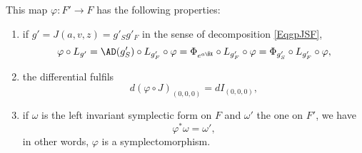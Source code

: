 \begin{proposition}
This map $\varphi\colon F'\to F$ has the following properties:
\begin{enumerate}
\item if $g'=J(a,v,z)=g'_{S}g'_{F}$ in the sense of decomposition \eqref{EqgpJSF},
\begin{equation}
\varphi\circ L_{g'}=\AD(g'_{S})\circ L_{g'_{F}}\circ\varphi=\Phi_{ e^{a\bar{\BX }}}\circ L_{g'_{F}}\circ\varphi=\Phi_{g'_{S}}\circ L_{g'_{F}}\circ\varphi,
\end{equation}
\item the differential fulfils
\begin{equation}
d(\varphi\circ J)_{(0,0,0)}=dI_{(0,0,0)},
\end{equation}
\item if $\omega$ is the left invariant symplectic form on $F$ and $\omega'$ the one on $F'$, we have
\[ 
  \varphi^*\omega=\omega',
\]
in other words, $\varphi$ is a symplectomorphism.

\end{enumerate}

\end{proposition}
